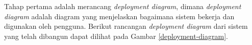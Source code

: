 
Tahap pertama adalah merancang \textit{deployment diagram}, dimana \textit{deployment diagram} adalah diagram yang menjelaskan bagaimana sistem bekerja dan digunakan oleh pengguna. Berikut rancangan \textit{deployment diagram} dari sistem yang telah dibangun dapat dilihat pada Gambar \ref{deployment-diagram}.


